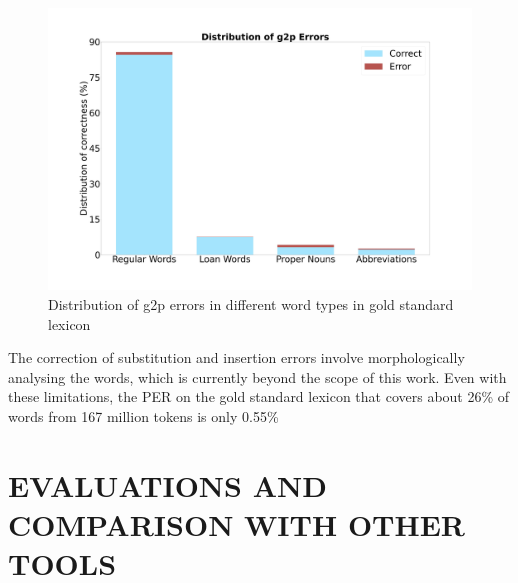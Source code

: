 \documentclass{ieeeaccess}
\begin{document}
\begin{figure}[h]
    \centering
    \includegraphics[width=\linewidth]{g2p-error.jpg}
    \caption{Distribution of g2p errors in different word types in gold standard lexicon}
    \label{g2p-error}
\end{figure}






The correction of substitution and insertion errors involve morphologically analysing the words, which is currently beyond the scope of this work. Even with these limitations, the PER on the gold standard lexicon that covers about 26\% of words from 167 million tokens is only 0.55\% 



\section{EVALUATIONS AND COMPARISON WITH OTHER TOOLS}
\label{asr}
\end{document}
